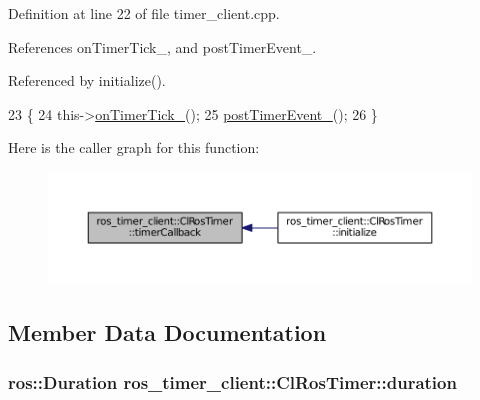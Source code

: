 Definition at line 22 of file timer\+\_\+client.\+cpp.



References on\+Timer\+Tick\+\_\+, and post\+Timer\+Event\+\_\+.



Referenced by initialize().


\begin{DoxyCode}
23 \{
24     this->\hyperlink{classros__timer__client_1_1ClRosTimer_a8c7a2ee6e8e8512b3f997e5560c0dc18}{onTimerTick\_}();
25     \hyperlink{classros__timer__client_1_1ClRosTimer_a36d871ca009545bf5f43b8b18064e075}{postTimerEvent\_}();
26 \}
\end{DoxyCode}


Here is the caller graph for this function\+:
\nopagebreak
\begin{figure}[H]
\begin{center}
\leavevmode
\includegraphics[width=350pt]{classros__timer__client_1_1ClRosTimer_a185e36ae923a104618300d6b67b6864d_icgraph}
\end{center}
\end{figure}




\subsection{Member Data Documentation}
\subsubsection[{\texorpdfstring{duration}{duration}}]{\setlength{\rightskip}{0pt plus 5cm}ros\+::\+Duration ros\+\_\+timer\+\_\+client\+::\+Cl\+Ros\+Timer\+::duration\hspace{0.3cm}{\ttfamily [protected]}}\hypertarget{classros__timer__client_1_1ClRosTimer_a79df7a52481e520ba959f3e6afb0a817}{}\label{classros__timer__client_1_1ClRosTimer_a79df7a52481e520ba959f3e6afb0a817}


